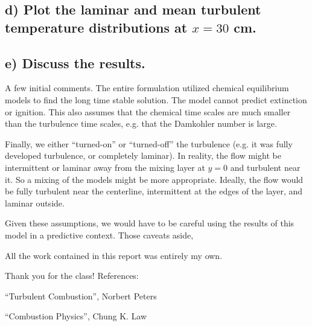 \documentclass{article}
\begin{document}
\subsection*{d) Plot the laminar and mean turbulent temperature
distributions at $x=30$ cm.}

\subsection*{e) Discuss the results.}

A few initial comments. The entire formulation utilized chemical equilibrium models 
to find the long time stable solution. The model cannot predict extinction or ignition. 
This also assumes that the chemical time scales are much smaller than the turbulence 
time scales, e.g. that the Damkohler number is large. 

Finally, we either ``turned-on'' or ``turned-off'' the turbulence
(e.g. it was fully developed turbulence, or completely laminar). In
reality, the flow might be intermittent or laminar away from the mixing
layer at $y=0$ and turbulent near it. So a mixing of the models might be
more appropriate. Ideally, the flow would be fully turbulent near the
centerline, intermittent at the edges of the layer, and laminar outside.  

Given these assumptions, we would have to be careful using the results of 
this model in a predictive context. Those caveats aside, 

\newpage
All the work contained in this report was entirely my own. 

Thank you for the class! 
\vspace{1in}
\newline
References:

``Turbulent Combustion'', Norbert Peters

``Combustion Physics'', Chung K. Law
\end{document}
